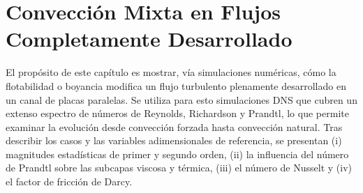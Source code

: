 \chapter{Convección Mixta en Flujos Completamente Desarrollado} \label{cap:desarrollado}

El propósito de este capítulo es mostrar, vía simulaciones numéricas, cómo la flotabilidad o boyancia modifica un flujo turbulento plenamente desarrollado en un canal de placas paralelas. Se utiliza para esto simulaciones DNS que cubren un extenso espectro de números de Reynolds, Richardson y Prandtl, lo que permite examinar la evolución desde convección forzada hasta convección natural. Tras describir los casos y las variables adimensionales de referencia, se presentan (i) magnitudes estadísticas de primer y segundo orden, (ii) la influencia del número de Prandtl sobre las subcapas viscosa y térmica, (iii) el número de Nusselt y (iv) el factor de fricción de Darcy.

%
%
%
%



